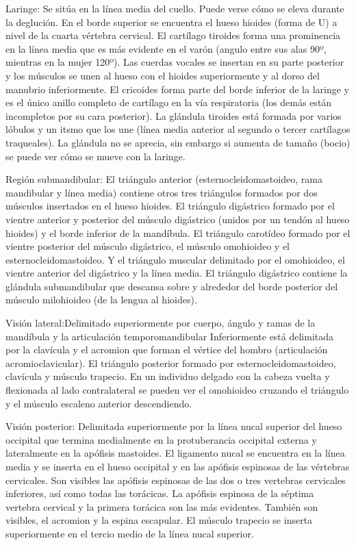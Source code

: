 \documentclass[a4paper,12pt]{article} %
\begin{document}
Laringe: Se sitúa en la línea media del cuello. Puede verse cómo se eleva durante la deglución. En el borde superior se encuentra el hueso hioides (forma de U) a nivel de la cuarta vértebra cervical. El cartílago tiroides forma una prominencia en la línea media que es más evidente en el varón (angulo entre sus alas 90º, mientras en la mujer 120º). Las cuerdas vocales se insertan en su parte posterior y los músculos se unen al hueso con el hioides superiormente y al dorso del manubrio inferiormente. El cricoides forma parte del borde inferior de la laringe y es el único anillo completo de cartílago en la vía respiratoria (los demás están incompletos por su cara posterior). La glándula tiroides está formada por varios lóbulos y un itsmo que los une (línea media anterior al segundo o tercer cartílagos traqueales). La glándula no se aprecia, sin embargo si aumenta de tamaño (bocio) se puede ver cómo se mueve con la laringe. 

Región submandibular: El triángulo anterior (esternocleidomastoideo, rama mandibular y línea media) contiene otros tres triángulos formados por dos músculos insertados en el hueso hioides. El triángulo digástrico formado por el vientre anterior y posterior del músculo digástrico (unidos por un tendón al hueso hioides) y el borde inferior de la mandíbula. El triángulo carotídeo formado por el vientre posterior del músculo digástrico, el músculo omohioideo y el esternocleidomastoideo. Y el triángulo muscular delimitado por el omohioideo, el vientre anterior del digástrico y la línea media. El triángulo digástrico contiene la glándula submandibular que descansa sobre y alrededor del borde posterior del músculo milohioideo (de la lengua al hioides). 

Visión lateral:Delimitado superiormente por cuerpo, ángulo y ramas de la mandíbula y la articulación temporomandibular Inferiormente está delimitada por la clavícula y el acromion que forman el vértice del hombro (articulación acromioclavicular).
El triángulo posterior formado por esternocleidomastoideo, clavícula y músculo trapecio. En un individuo delgado con la cabeza vuelta y flexionada al lado contralateral se pueden ver el omohioideo cruzando el triángulo y el músculo escaleno anterior descendiendo.

Visión posterior: Delimitada superiormente por la línea nucal superior del hueso occipital que termina medialmente en la protuberancia occipital externa y lateralmente en la apófisis mastoides.
El ligamento nucal se encuentra en la línea media y se inserta en el hueso occipital y en las apófisis espinosas de las vértebras cervicales. Son visibles las apófisis espinosas de las dos o tres vertebras cervicales inferiores, así como todas las torácicas. La apófisis espinosa de la séptima vertebra cervical  y la primera torácica son las más evidentes. También son visibles, el acromion y la espina escapular.
El músculo trapecio se inserta superiormente en el tercio medio de la línea nucal superior.
\end{document}
